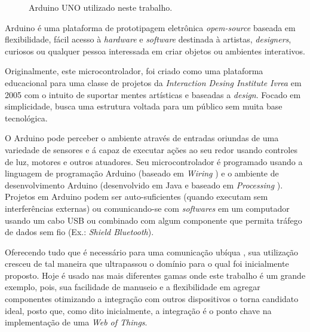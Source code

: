 \documentclass[12pt,a4paper,oneside]{report}
\begin{document}
\begin{figure}[h!]
\centering
{}\caption{Arduino UNO utilizado neste trabalho.}
\label{fig:arduino}
\end{figure}

Arduino \cite{arduino} é uma plataforma de prototipagem eletrônica \emph{opem-source} baseada em flexibilidade, fácil acesso à \emph{hardware} e \emph{software} destinada à artistas, \emph{designers}, curiosos ou qualquer pessoa interessada em criar objetos ou ambientes interativos.

Originalmente, este microcontrolador, foi criado como uma plataforma educacional para uma classe de projetos da \emph{Interaction Desing Institute Ivrea} em 2005 com o intuito de suportar mentes artísticas e baseadas a \emph{design}. Focado em simplicidade, busca uma estrutura voltada para um público sem muita base tecnológica.

O Arduino pode perceber o ambiente através de entradas oriundas de uma variedade de sensores e á capaz de executar ações ao seu redor usando controles de luz, motores e outros atuadores. Seu microcontrolador é programado usando a linguagem de programação Arduino \cite{arduinoapi} (baseado em \emph{Wiring} \cite{wiring}) e o ambiente de desenvolvimento Arduino (desenvolvido em Java e baseado em \emph{Processing} \cite{processing}). Projetos em Arduino podem ser auto-suficientes (quando executam sem interferências externas) ou comunicando-se com \emph{softwares} em um computador usando um cabo USB ou combinado com algum componente que permita tráfego de dados sem fio (Ex.: \emph{Shield Bluetooth}).

Oferecendo tudo que é necessário para uma comunicação ubíqua \cite{Mark Weiser}, sua utilização cresceu de tal maneira que ultrapassou o domínio para o qual foi inicialmente proposto. Hoje é usado nas mais diferentes gamas onde este trabalho é um grande exemplo, pois, sua facilidade de manuseio e a flexibilidade em agregar componentes otimizando a integração com outros dispositivos o torna candidato ideal, posto que, como dito inicialmente, a integração é o ponto chave na implementação de uma \emph{Web of Things}.
\end{document}
